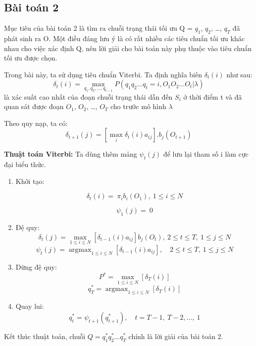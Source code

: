 \documentclass[13pt]{extreport}
\DeclareMathOperator*{\argmax}{argmax} %
\begin{document}
\subsection{\textbf{{Bài toán 2}}}


Mục tiêu của bài toán 2 là tìm ra chuỗi trạng thái   tối ưu Q =  $q_1$, $q_2$, …, $q_T$  đã phát sinh ra O. Một điều đáng lưu ý là có rất nhiều các tiêu chuẩn  tối ưu khác nhau cho việc xác định Q, nên lời giải cho bài toán này phụ thuộc vào tiêu chuẩn tối ưu được chọn.  \par

Trong bài này, ta sử dụng tiêu chuẩn Viterbi. Ta định nghĩa biến $\delta _t(i)$ như sau: 
$$ \delta _t(i) = \max_{q_{1},q_{2},...,q_{t-1}} P \left( q_{1} q_{2} ... q_{t}=i, O_{1} O_{2} ... O_{t} \vert \lambda \right) $$
 là xác suất cao nhất của đoạn chuỗi trạng thái dẫn đến $S_i$ ở thời điểm t và đã quan sát được đoạn $O_1$, $O_2$, …, $O_T$ cho trước mô hình $  \lambda  $

Theo quy nạp, ta có: $$ \delta_{t+1} (j) = \left[\max_i \delta_t(i) a_{ij} \right].b_j \left(O_{t+1} \right) $$

\textbf{Thuật toán Viterbi:} Ta dùng thêm mảng $\psi_t (j)$ để lưu lại tham số i làm cực đại biểu thức.
\begin{enumerate}
\item Khởi tạo:

$$  \delta _{t} \left( i \right) =~ \pi _{i}b_{i} \left( O_{1} \right) ,~1 \leq i \leq N $$

$$  \psi _{1} \left( j \right) =~0 $$

\item Đệ quy: 
\begin{equation}
\delta _{t} \left( j \right) =\max_{1 \leq i \leq N} \left[  \delta _{t-1} \left( i \right) a_{ij} \right] b_{j} \left( O_{t} \right) ,~2 \leq t \leq T,~1 \leq j \leq N
\end{equation}
\begin{equation}
\psi _{t} \left( j \right) =\argmax_{1 \leq i \leq N} \left[  \delta _{t-1} \left( i \right) a_{ij} \right], \quad 2 \leq t \leq T,~1 \leq j \leq N 
\end{equation}

\item Dừng đệ quy: 
$$ P^{*}=\max_{1 \leq i \leq N} \left[\delta_T (i) \right] $$
\[ q_T^{*} = \argmax_{1\leq i \leq N} \left[\delta_T	(i) \right] \]

\item Quay lui: 
$$ q_{t}^{*}= \psi _{t+1} \left( q_{t+1}^{*} \right) ,\quad t=T-1,~T-2,…,~1 $$
\end{enumerate}
Kết thúc thuật toán, chuỗi $ Q=q_{1}^{*}q_{2}^{*}...q_{T}^{*} $
 chính là lời giải của bài toán 2. \par
\end{document}
